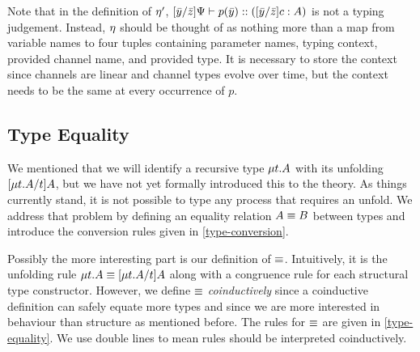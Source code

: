 
Note that in the definition of $\eta'$, $\lbrack{\bar{y}}/{\bar{z}}\rbrack{\Psi} \vdash {p}(\bar{y}) :: (\lbrack{\bar{y}}/{\bar{z}}\rbrack{c} : A)$ is not a typing judgement. Instead, $\eta$ should be thought of as nothing more than a map from variable names to four tuples containing parameter names, typing context, provided channel name, and provided type. It is necessary to store the context since channels are linear and channel types evolve over time, but the context needs to be the same at every occurrence of $p$.


\subsection{Type Equality}
\label{base:type-equality}

We mentioned that we will identify a recursive type $\mu{t} . {A}$ with its unfolding $\lbrack{\mu{t} . {A}}/{t}\rbrack{A}$, but we have not yet formally introduced this to the theory. As things currently stand, it is not possible to type any process that requires an unfold. We address that problem by defining an equality relation $A \equiv B$ between types and introduce the conversion rules given in \cref{type-conversion}.


Possibly the more interesting part is our definition of $\equiv$. Intuitively, it is the unfolding rule $\mu{t} . {A} \equiv \lbrack{\mu{t} . {A}}/{t}\rbrack{A}$ along with a congruence rule for each structural type constructor. However, we define $\equiv$ \emph{coinductively} since a coinductive definition can safely equate more types \cite{StoneS05} and since we are more interested in behaviour than structure as mentioned before. The rules for $\equiv$ are given in \cref{type-equality}. We use double lines to mean rules should be interpreted coinductively.

